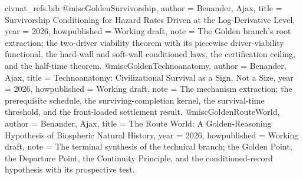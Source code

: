 \begin{filecontents}[overwrite]{civnat_refs.bib}
@misc{GoldenSurvivorship,
  author       = {Benander, Ajax},
  title        = {Survivorship Conditioning for Hazard Rates Driven at the Log-Derivative Level},
  year         = {2026},
  howpublished = {Working draft},
  note         = {The Golden branch's root extraction; the two-driver viability
                  theorem with its piecewise driver-viability functional, the
                  hard-wall and soft-wall conditioned laws, the certification
                  ceiling, and the half-time theorem.}
}
@misc{GoldenTechnoanatomy,
  author       = {Benander, Ajax},
  title        = {Technoanatomy: Civilizational Survival as a Sign, Not a Size},
  year         = {2026},
  howpublished = {Working draft},
  note         = {The mechanism extraction; the prerequisite schedule, the
                  surviving-completion kernel, the survival-time threshold, and the
                  front-loaded settlement result.}
}
@misc{GoldenRouteWorld,
  author       = {Benander, Ajax},
  title        = {The Route World: A Golden-Reasoning Hypothesis of Biospheric Natural History},
  year         = {2026},
  howpublished = {Working draft},
  note         = {The terminal synthesis of the technical branch; the Golden Point,
                  the Departure Point, the Continuity Principle, and the
                  conditioned-record hypothesis with its prospective test.}
}


\end{filecontents}
